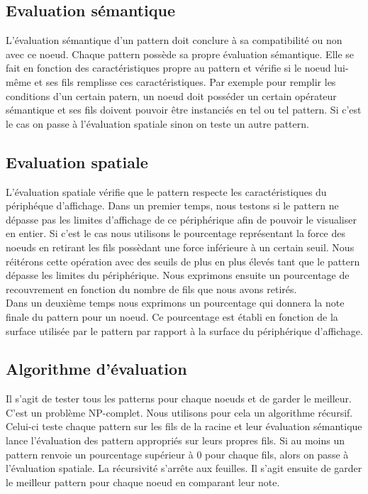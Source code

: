 \documentclass[fleqn]{article-hermes}
\begin{document}
\subsection{Evaluation sémantique}
L'évaluation sémantique d'un pattern doit conclure à sa compatibilité ou non avec ce noeud. Chaque pattern possède sa propre évaluation sémantique. Elle se fait en fonction des caractéristiques propre au pattern et vérifie si le noeud lui-même et ses fils remplisse ces caractéristiques. Par exemple pour remplir les conditions d'un certain patern, un noeud doit posséder un certain opérateur sémantique et ses fils doivent pouvoir être instanciés en tel ou tel pattern. Si c'est le cas on passe à l'évaluation spatiale sinon on teste un autre pattern.
\subsection{Evaluation spatiale}
L'évaluation spatiale vérifie que le pattern respecte les caractéristiques du périphéque d'affichage. Dans un premier temps, nous testons si le pattern ne dépasse pas les limites d'affichage de ce périphérique afin de pouvoir le visualiser en entier. Si c'est le cas nous utilisons le pourcentage représentant la force des noeuds en retirant les fils possèdant une force inférieure à un certain seuil. Nous réitérons cette opération avec des seuils de plus en plus élevés tant que le pattern dépasse les limites du périphérique. Nous exprimons ensuite un pourcentage de recouvrement en fonction du nombre de fils que nous avons retirés.\\
Dans un deuxième temps nous exprimons un pourcentage qui donnera la note finale du pattern pour un noeud. Ce pourcentage est établi en fonction de la surface utilisée par le pattern par rapport à la surface du périphérique d'affichage.
\subsection{Algorithme d'évaluation}
Il s'agit de tester tous les patterns pour chaque noeuds et de garder le meilleur. C'est un problème NP-complet. Nous utilisons pour cela un algorithme récursif. Celui-ci teste chaque pattern sur les fils de la racine et leur évaluation sémantique lance l'évaluation des pattern appropriés sur leurs propres fils. Si au moins un pattern renvoie un pourcentage supérieur à 0 pour chaque fils, alors on passe à l'évaluation spatiale. La récursivité s'arrête aux feuilles. Il s'agit ensuite de garder le meilleur pattern pour chaque noeud en comparant leur note.
\end{document}
